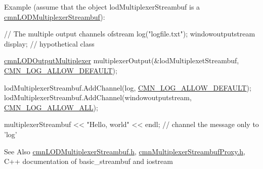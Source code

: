 Example (assume that the object lod\-Multiplexer\-Streambuf is a \hyperlink{classcmn_l_o_d_multiplexer_streambuf}{cmn\-L\-O\-D\-Multiplexer\-Streambuf})\-:


\begin{DoxyCode}
\textcolor{comment}{// The multiple output channels}
ofstream log(\textcolor{stringliteral}{"logfile.txt"});
windowoutputstream display;  \textcolor{comment}{// hypothetical class}

\hyperlink{classcmn_l_o_d_output_multiplexer}{cmnLODOutputMultiplexer} multiplexerOutput(&lodMultiplexetStreambuf, 
      \hyperlink{cmn_log_lo_d_8h_a941e5ff3075571f0ad1e53e1204bd856}{CMN\_LOG\_ALLOW\_DEFAULT});

lodMultiplexerStreambuf.AddChannel(log, \hyperlink{cmn_log_lo_d_8h_a941e5ff3075571f0ad1e53e1204bd856}{CMN\_LOG\_ALLOW\_DEFAULT});
lodMultiplexerStreambuf.AddChannel(windowoutputstream, \hyperlink{cmn_log_lo_d_8h_acf03c43c8a0fbe1c13b2aa4ac3b0a856}{CMN\_LOG\_ALLOW\_ALL});

multiplexerStreambuf << \textcolor{stringliteral}{"Hello, world"} << endl;  \textcolor{comment}{// channel the message only to 'log'}
\end{DoxyCode}


\begin{DoxySeeAlso}{See Also}
\hyperlink{cmn_l_o_d_multiplexer_streambuf_8h}{cmn\-L\-O\-D\-Multiplexer\-Streambuf.\-h}, \hyperlink{cmn_multiplexer_streambuf_proxy_8h}{cmn\-Multiplexer\-Streambuf\-Proxy.\-h}, C++ documentation of basic\-\_\-streambuf and iostream 
\end{DoxySeeAlso}


